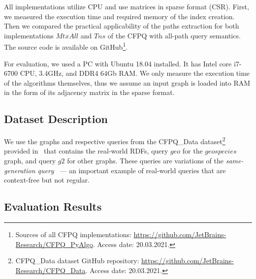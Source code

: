 All implementations utilize CPU and use matrices in sparse format (CSR). First, we measured the execution time and required memory of the index creation. Then we compared the practical applicability of the paths extraction for both implementations $MtxAll$ and $Tns$ of the CFPQ with all-path query semantics. The source code is available on GitHub\footnote{Sources of all CFPQ implementations: \url{https://github.com/JetBrains-Research/CFPQ\_PyAlgo}. Access date: 20.03.2021.}.

For evaluation, we used a PC with Ubuntu 18.04 installed.
It has Intel core i7-6700 CPU, 3.4GHz, and DDR4 64Gb RAM.
We only measure the execution time of the algorithms themselves, thus we assume an input graph is loaded into RAM in the form of its adjacency matrix in the sparse format.

\subsection{Dataset Description}

We use the graphs and respective queries from the CFPQ\_Data dataset\footnote{CFPQ\_Data dataset GitHub repository: \url{https://github.com/JetBrains-Research/CFPQ_Data}. Access date: 20.03.2021.} provided in~\cite{10.1145/3398682.3399163} that contains the real-world RDFs, query $geo$ for the $geospecies$ graph, and query $g2$ for other graphs. These queries are variations of the \textit{same-generation query}~\cite{FndDB} --- an important example of real-world queries that are context-free but not regular.




\subsection{Evaluation Results}

